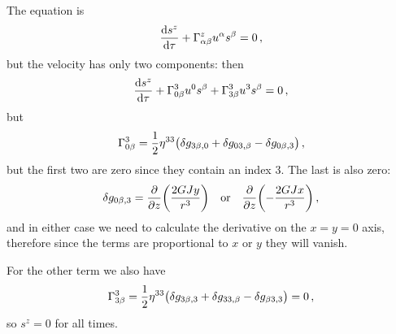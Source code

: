 \documentclass[main.tex]{subfiles}
\begin{document}
The equation is 
%
\begin{align}
  \dv{s^{z}}{\tau } + \Gamma^{z}_{\alpha \beta } u^{\alpha } s^{\beta }= 0
\,,
\end{align}
%
but the velocity has only two components: then 
%
\begin{align}
  \dv{s^{z}}{\tau } + \Gamma^{3}_{0 \beta } u^{0} s^{\beta } + \Gamma^{3}_{3 \beta } u^{3} s^{\beta } = 0
\,,
\end{align}
%
but 
%
\begin{align}
  \Gamma^{3}_{0 \beta } = \frac{1}{2} \eta^{3 3 } \qty(
      \delta g_{3 \beta , 0 }
      + \delta g_{03, \beta }
      - \delta g_{0 \beta , 3}
  )
\,,
\end{align}
%
but the first two are zero since they contain an index \(3\). The last is also zero: 
%
\begin{align}
  \delta g_{0 \beta , 3} = \pdv{}{z} \qty(\frac{2GJy}{r^{3}}) \quad \text{or}\quad 
  \pdv{}{z} \qty(-\frac{2GJx}{r^{3}})
\,,
\end{align}
%
and in either case we need to calculate the derivative on the \(x=y=0\) axis, therefore since the terms are proportional to \(x\) or \(y\) they will vanish. 

For the other term we also have
%
\begin{align}
  \Gamma^{3}_{3 \beta } = \frac{1}{2} \eta^{33} \qty(\delta g_{3 \beta , 3} + \delta g_{33, \beta } - \delta g_{\beta 3, 3}) =0 
\,,
\end{align}
%
so \(s^{z} = 0\) for all times. 
\end{document}
